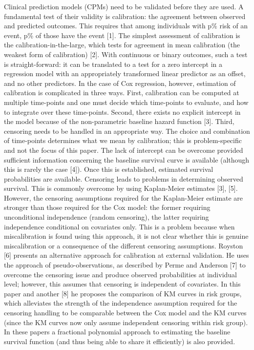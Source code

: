 \documentclass[12pt,twoside]{reedthesis}
\begin{document}
Clinical prediction models (CPMs) need to be validated before they are used. A fundamental test of their validity is calibration: the agreement between observed and predicted outcomes. This requires that among individuals with p\% risk of an event, p\% of those have the event {[}1{]}. The simplest assessment of calibration is the calibration-in-the-large, which tests for agreement in mean calibration (the weakest form of calibration) {[}2{]}. With continuous or binary outcomes, such a test is straight-forward: it can be translated to a test for a zero intercept in a regression model with an appropriately transformed linear predictor as an offset, and no other predictors.
In the case of Cox regression, however, estimation of calibration is complicated in three ways. First, calibration can be computed at multiple time-points and one must decide which time-points to evaluate, and how to integrate over these time-points. Second, there exists no explicit intercept in the model because of the non-parametric baseline hazard function {[}3{]}. Third, censoring needs to be handled in an appropriate way. The choice and combination of time-points determines what we mean by calibration; this is problem-specific and not the focus of this paper. The lack of intercept can be overcome provided sufficient information concerning the baseline survival curve is available (although this is rarely the case {[}4{]}). Once this is established, estimated survival probabilities are available. Censoring leads to problems in determining observed survival. This is commonly overcome by using Kaplan-Meier estimates {[}3{]}, {[}5{]}. However, the censoring assumptions required for the Kaplan-Meier estimate are stronger than those required for the Cox model: the former requiring unconditional independence (random censoring), the latter requiring independence conditional on covariates only. This is a problem because when miscalibration is found using this approach, it is not clear whether this is genuine miscalibration or a consequence of the different censoring assumptions.
Royston {[}6{]} presents an alternative approach for calibration at external validation. He uses the approach of pseudo-observations, as described by Perme and Anderson {[}7{]} to overcome the censoring issue and produce observed probabilities at individual level; however, this assumes that censoring is independent of covariates. In this paper and another {[}8{]} he proposes the comparison of KM curves in risk groups, which alleviates the strength of the independence assumption required for the censoring handling to be comparable between the Cox model and the KM curves (since the KM curves now only assume independent censoring within risk group). In these papers a fractional polynomial approach to estimating the baseline survival function (and thus being able to share it efficiently) is also provided.
\end{document}
